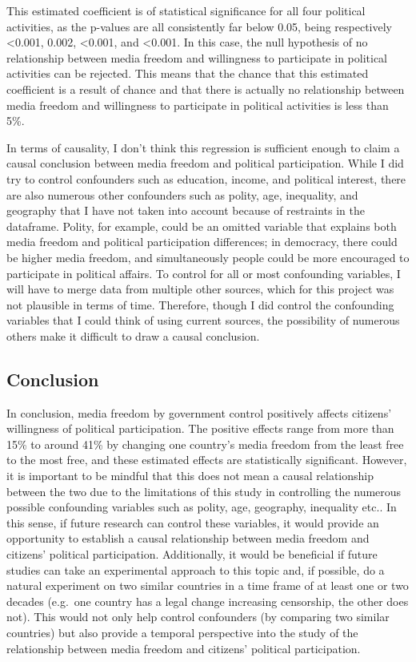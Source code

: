 \documentclass[
]{article}
\begin{document}
This estimated coefficient is of statistical significance for all four
political activities, as the p-values are all consistently far below
0.05, being respectively \textless0.001, 0.002, \textless0.001, and
\textless0.001. In this case, the null hypothesis of no relationship
between media freedom and willingness to participate in political
activities can be rejected. This means that the chance that this
estimated coefficient is a result of chance and that there is actually
no relationship between media freedom and willingness to participate in
political activities is less than 5\%.

In terms of causality, I don't think this regression is sufficient
enough to claim a causal conclusion between media freedom and political
participation. While I did try to control confounders such as education,
income, and political interest, there are also numerous other
confounders such as polity, age, inequality, and geography that I have
not taken into account because of restraints in the dataframe. Polity,
for example, could be an omitted variable that explains both media
freedom and political participation differences; in democracy, there
could be higher media freedom, and simultaneously people could be more
encouraged to participate in political affairs. To control for all or
most confounding variables, I will have to merge data from multiple
other sources, which for this project was not plausible in terms of
time. Therefore, though I did control the confounding variables that I
could think of using current sources, the possibility of numerous others
make it difficult to draw a causal conclusion.

\hypertarget{conclusion}{%
\subsection{Conclusion}\label{conclusion}}

In conclusion, media freedom by government control positively affects
citizens' willingness of political participation. The positive effects
range from more than 15\% to around 41\% by changing one country's media
freedom from the least free to the most free, and these estimated
effects are statistically significant. However, it is important to be
mindful that this does not mean a causal relationship between the two
due to the limitations of this study in controlling the numerous
possible confounding variables such as polity, age, geography,
inequality etc.. In this sense, if future research can control these
variables, it would provide an opportunity to establish a causal
relationship between media freedom and citizens' political
participation. Additionally, it would be beneficial if future studies
can take an experimental approach to this topic and, if possible, do a
natural experiment on two similar countries in a time frame of at least
one or two decades (e.g.~one country has a legal change increasing
censorship, the other does not). This would not only help control
confounders (by comparing two similar countries) but also provide a
temporal perspective into the study of the relationship between media
freedom and citizens' political participation.
\end{document}
